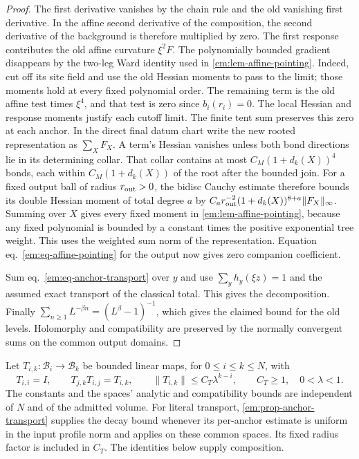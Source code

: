 \documentclass[11pt,letterpaper,reqno]{amsart}
\numberwithin{equation}{section}
\renewcommand{\eqref}[1]{\textup{eq.~\ref{#1}}}
\theoremstyle{definition}
\theoremstyle{remark}
\begin{document}
\begin{proof}
The first derivative vanishes by the chain rule and the old
vanishing first derivative. In the affine second derivative of
the composition, the second derivative of the background is
therefore multiplied by zero. The first response contributes the
old affine curvature \(\xi^2F\). The polynomially bounded gradient
disappears by the two-leg Ward identity used in
\cref{em:lem-affine-pointing}. Indeed, cut off its site field and
use the old Hessian moments to pass to the limit; those moments
hold at every fixed polynomial order. The remaining term is the old affine
test times \(\xi^4\), and that test is zero since \(b_i(r_i)=0\).
The local Hessian and response moments justify each cutoff limit.
The finite tent sum preserves this zero at each anchor.
In the direct final datum chart write the new rooted representation
as $\sum_X F_X$. A term's Hessian vanishes unless both bond
directions lie in its determining collar. That collar contains
at most $C_M(1+d_k(X))^4$ bonds, each within
$C_M(1+d_k(X))$ of the root after the bounded join. For a fixed
output ball of radius $r_{\rm out}>0$, the bidisc Cauchy estimate
therefore bounds its double Hessian moment of total degree $a$ by
$C_a r_{\rm out}^{-2}(1+d_k(X))^{8+a}\|F_X\|_\infty$.
Summing over $X$ gives every fixed moment in
\cref{em:lem-affine-pointing}, because any fixed polynomial is
bounded by a constant times the positive exponential tree weight.
This uses the weighted sum norm of the representation.
Equation \eqref{em:eq-affine-pointing} for the output now gives
zero companion coefficient.

Sum \eqref{em:eq-anchor-transport} over \(y\) and use
\(\sum_y h_y(\xi z)=1\) and the assumed exact transport of the
classical total. This gives the decomposition. Finally
\(\sum_{n\ge1}L^{-\beta n}=(L^\beta-1)^{-1}\), which gives the
claimed bound for the old levels. Holomorphy and compatibility
are preserved by the normally convergent sums on the common
output domains.
\end{proof}

Let $T_{i,k}:\mathcal B_i\to\mathcal B_k$ be bounded linear maps,
for $0\le i\le k\le N$, with
\begin{equation}\label{em:eq-transport-data}
 T_{i,i}=I,\qquad T_{j,k}T_{i,j}=T_{i,k},\qquad
 \|T_{i,k}\|\le C_T\lambda^{k-i},\qquad
 C_T\ge1,\quad 0<\lambda<1.
\end{equation}
The constants and the spaces' analytic and compatibility bounds
are independent of $N$ and of the admitted volume.
For literal transport, \cref{em:prop-anchor-transport} supplies the
decay bound whenever its per-anchor estimate is uniform in the input
profile norm and applies on these common spaces. Its fixed radius
factor is included in $C_T$. The identities below supply composition.
\end{document}
